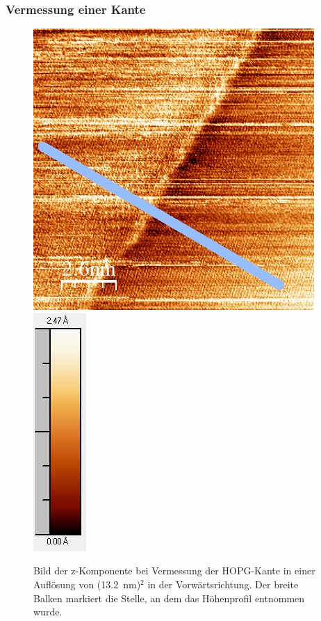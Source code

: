 \documentclass[12pt,a4paper]{article}
\begin{document}
\subsubsection{Vermessung einer Kante}
\begin{figure}
\centering
\includegraphics[scale=0.6]{Bilder/Anhang/Kante/0132_Kante_vor.jpg}
\includegraphics[scale=0.6]{Bilder/Anhang/Kante/0132_Kante_vor_Skala.jpg}
\caption{Bild der z-Komponente bei Vermessung der HOPG-Kante in einer Auflösung von (\SI{13,2}{nm})$^2$ in der Vorwärtsrichtung. Der breite Balken markiert die Stelle, an dem das Höhenprofil entnommen wurde.}
\label{fig:Kante_Beispiel}
\end{figure}
\end{document}
